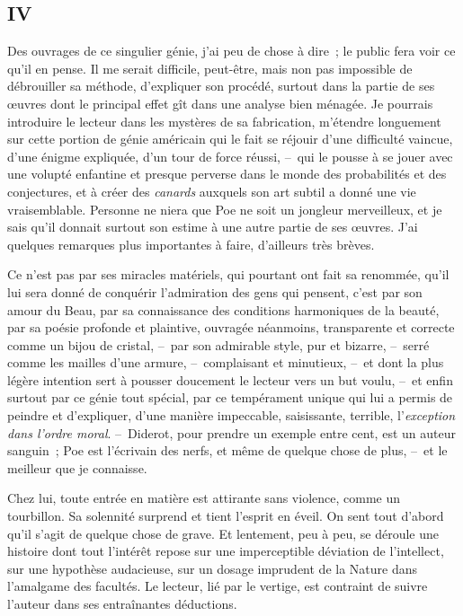 \documentclass[french,twoside]{book} %
\begin{document}
\subsection[{IV}]{IV}
\noindent Des ouvrages de ce singulier génie, j’ai peu de chose à dire ; le public fera voir ce qu’il en pense. Il me serait difficile, peut-être, mais non pas impossible de débrouiller sa méthode, d’expliquer son procédé, surtout dans la partie de ses œuvres dont le principal effet gît dans une analyse bien ménagée. Je pourrais introduire le lecteur dans les mystères de sa fabrication, m’étendre longuement sur cette portion de génie américain qui le fait se réjouir d’une difficulté vaincue, d’une énigme expliquée, d’un tour de force réussi, – qui le pousse à se jouer avec une volupté enfantine et presque perverse dans le monde des probabilités et des conjectures, et à créer des \emph{canards} auxquels son art subtil a donné une vie vraisemblable. Personne ne niera que Poe ne soit un jongleur merveilleux, et je sais qu’il donnait surtout son estime à une autre partie de ses œuvres. J’ai quelques remarques plus importantes à faire, d’ailleurs très brèves.\par
Ce n’est pas par ses miracles matériels, qui pourtant ont fait sa renommée, qu’il lui sera donné de conquérir l’admiration des gens qui pensent, c’est par son amour du Beau, par sa connaissance des conditions harmoniques de la beauté, par sa poésie profonde et plaintive, ouvragée néanmoins, transparente et correcte comme un bijou de cristal, – par son admirable style, pur et bizarre, – serré comme les mailles d’une armure, – complaisant et minutieux, – et dont la plus légère intention sert à pousser doucement le lecteur vers un but voulu, – et enfin surtout par ce génie tout spécial, par ce tempérament unique qui lui a permis de peindre et d’expliquer, d’une manière impeccable, saisissante, terrible, l’\emph{exception dans l’ordre moral}. – Diderot, pour prendre un exemple entre cent, est un auteur sanguin ; Poe est l’écrivain des nerfs, et même de quelque chose de plus, – et le meilleur que je connaisse.\par
Chez lui, toute entrée en matière est attirante sans violence, comme un tourbillon. Sa solennité surprend et tient l’esprit en éveil. On sent tout d’abord qu’il s’agit de quelque chose de grave. Et lentement, peu à peu, se déroule une histoire dont tout l’intérêt repose sur une imperceptible déviation de l’intellect, sur une hypothèse audacieuse, sur un dosage imprudent de la Nature dans l’amalgame des facultés. Le lecteur, lié par le vertige, est contraint de suivre l’auteur dans ses entraînantes déductions.\par
\end{document}
